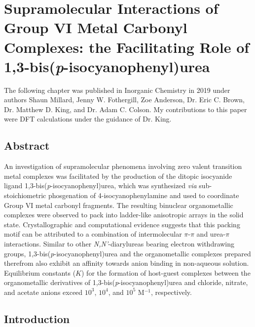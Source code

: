 \chapter{Supramolecular Interactions of Group VI Metal Carbonyl Complexes: the Facilitating Role of 1,3-bis(\textit{p}-isocyanophenyl)urea}
\label{chap:supra}

The following chapter was published in Inorganic Chemistry in 2019 under authors Shaun Millard, Jenny W. Fothergill, Zoe Anderson, Dr. Eric C. Brown, Dr. Matthew D. King, and Dr. Adam C. Colson. My contributions to this paper were DFT calculations under the guidance of Dr. King.

\section{Abstract}

An investigation of supramolecular phenomena involving zero valent transition metal complexes was facilitated by the production of the ditopic isocyanide ligand 1,3-bis(\textit{p}-isocyanophenyl)urea, which was synthesized \textit{via} sub-stoichiometric phosgenation of 4-isocyanophenylamine and used to coordinate Group VI metal carbonyl fragments. The resulting binuclear organometallic complexes were observed to pack into ladder-like anisotropic arrays in the solid state. Crystallographic and computational evidence suggests that this packing motif can be attributed to a combination of intermolecular $\pi$-$\pi$ and urea-$\pi$ interactions. Similar to other \textit{N,N'}-diarylureas bearing electron withdrawing groups, 1,3-bis(\textit{p}-isocyanophenyl)urea and the organometallic complexes prepared therefrom also exhibit an affinity towards anion binding in non-aqueous solution. Equilibrium constants ($K$) for the formation of host-guest complexes between the organometallic derivatives of 1,3-bis(\textit{p}-isocyanophenyl)urea and chloride, nitrate, and acetate anions exceed $10^{3}$, $10^{4}$, and $10^{5}$ M$^{-1}$, respectively.   

\section{Introduction}

